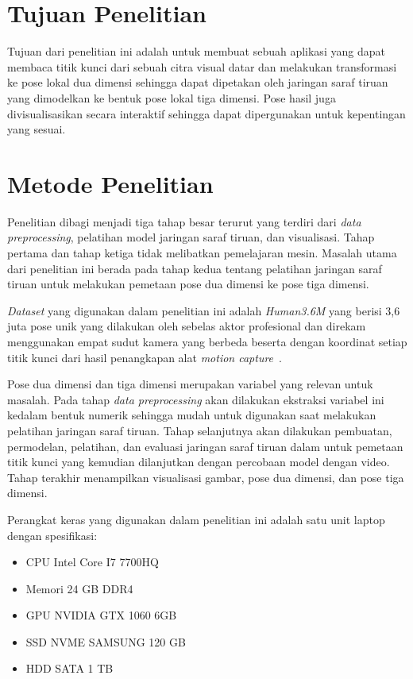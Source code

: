 \section{Tujuan Penelitian}
\label{sec:1-TujuanPenelitian}

Tujuan dari penelitian ini adalah untuk membuat sebuah aplikasi yang dapat membaca titik kunci dari 
sebuah citra visual datar dan melakukan transformasi ke pose lokal dua dimensi sehingga dapat 
dipetakan oleh jaringan saraf tiruan yang dimodelkan ke bentuk pose lokal tiga dimensi. Pose hasil
juga divisualisasikan secara interaktif sehingga dapat dipergunakan untuk kepentingan yang sesuai.

\section{Metode Penelitian}
\label{sec:1-MetodePenelitian}

Penelitian dibagi menjadi tiga tahap besar terurut yang terdiri dari \textit{data preprocessing}, 
pelatihan model jaringan saraf tiruan, dan visualisasi. Tahap pertama dan tahap ketiga tidak 
melibatkan pemelajaran mesin. Masalah utama dari penelitian ini berada pada tahap kedua tentang 
pelatihan jaringan saraf tiruan untuk melakukan pemetaan pose dua dimensi ke pose tiga dimensi.

\textit{Dataset} yang digunakan dalam penelitian ini adalah \textit{Human3.6M} yang berisi 3,6 juta 
pose unik yang dilakukan oleh sebelas aktor profesional dan direkam menggunakan empat sudut kamera 
yang berbeda beserta dengan koordinat setiap titik kunci dari hasil penangkapan alat 
\textit{motion capture}~\cite{h36m_pami}.

Pose dua dimensi dan tiga dimensi merupakan variabel yang relevan untuk masalah. Pada tahap 
\textit{data preprocessing} akan dilakukan ekstraksi variabel ini kedalam bentuk numerik sehingga 
mudah untuk digunakan saat melakukan pelatihan jaringan saraf tiruan. Tahap selanjutnya akan 
dilakukan pembuatan, permodelan, pelatihan, dan evaluasi jaringan saraf tiruan dalam untuk 
pemetaan titik kunci yang kemudian dilanjutkan dengan percobaan model dengan video. Tahap terakhir 
menampilkan visualisasi gambar, pose dua dimensi, dan pose tiga dimensi.

Perangkat keras yang digunakan dalam penelitian ini adalah satu unit laptop dengan spesifikasi:
\begin{itemize}
  \item CPU Intel Core I7 7700HQ
  \item Memori 24 GB DDR4
  \item GPU NVIDIA GTX 1060 6GB
  \item SSD NVME SAMSUNG 120 GB
  \item HDD SATA 1 TB
\end{itemize}

